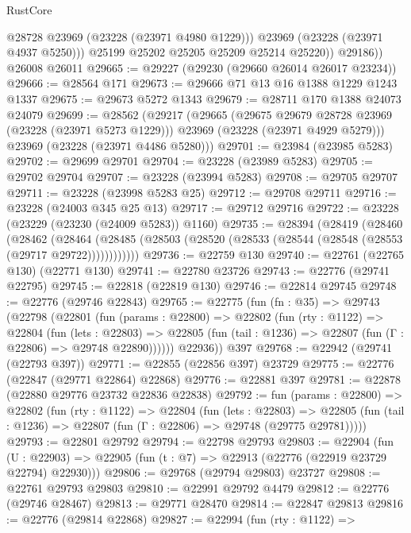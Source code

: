 \begin{lexlean}{RustCore}
\begin{coremodule}
                @28728
                @23969
                (@23228 (@23971 @4980 @1229)))
              @23969
              (@23228 (@23971 @4937 @5250)))
            @25199
            @25202
            @25205
            @25209
            @25214
            @25220))
        @29186))
    @26008
    @26011
@29665 := @29227 (@29230 (@29660 @26014 @26017 @23234))
@29666 := @28564 @171
@29673 := @29666 @71 @13 @16 @1388 @1229 @1243 @1337
@29675 := @29673 @5272 @1343
@29679 := @28711 @170 @1388 @24073 @24079
@29699 := @28562
    (@29217
      (@29665
        (@29675 @29679 @28728 @23969 (@23228 (@23971 @5273 @1229)))
        @23969
        (@23228 (@23971 @4929 @5279)))
      @23969
      (@23228 (@23971 @4486 @5280)))
@29701 := @23984 (@23985 @5283)
@29702 := @29699 @29701
@29704 := @23228 (@23989 @5283)
@29705 := @29702 @29704
@29707 := @23228 (@23994 @5283)
@29708 := @29705 @29707
@29711 := @23228 (@23998 @5283 @25)
@29712 := @29708 @29711
@29716 := @23228 (@24003 @345 @25 @13)
@29717 := @29712 @29716
@29722 := @23228 (@23229 (@23230 (@24009 @5283)) @1160)
@29735 := @28394
    (@28419
      (@28460
        (@28462
          (@28464 (@28485 (@28503 (@28520 (@28533 (@28544 (@28548 (@28553 (@29717 @29722))))))))))))
@29736 := @22759 @130
@29740 := @22761 (@22765 @130) (@22771 @130)
@29741 := @22780 @23726
@29743 := @22776 (@29741 @22795)
@29745 := @22818 (@22819 @130)
@29746 := @22814 @29745
@29748 := @22776 (@29746 @22843)
@29765 := @22775
    (fun (fn : @35) =>
    @29743
      (@22798
        (@22801
          (fun (params : @22800) =>
          @22802
            (fun (rty : @1122) =>
            @22804
              (fun (lets : @22803) =>
              @22805 (fun (tail : @1236) => @22807 (fun (Γ : @22806) => @29748 @22890))))))
        @22936))
    @397
@29768 := @22942 (@29741 (@22793 @397))
@29771 := @22855 (@22856 @397) @23729
@29775 := @22776 (@22847 (@29771 @22864) @22868)
@29776 := @22881 @397
@29781 := @22878 (@22880 @29776 @23732 @22836 @22838)
@29792 := fun (params : @22800) =>
  @22802
    (fun (rty : @1122) =>
    @22804
      (fun (lets : @22803) =>
      @22805 (fun (tail : @1236) => @22807 (fun (Γ : @22806) => @29748 (@29775 @29781)))))
@29793 := @22801 @29792
@29794 := @22798 @29793
@29803 := @22904
    (fun (U : @22903) => @22905 (fun (t : @7) => @22913 (@22776 (@22919 @23729 @22794) @22930)))
@29806 := @29768 (@29794 @29803) @23727
@29808 := @22761 @29793 @29803
@29810 := @22991 @29792 @4479
@29812 := @22776 (@29746 @28467)
@29813 := @29771 @28470
@29814 := @22847 @29813
@29816 := @22776 (@29814 @22868)
@29827 := @22994
    (fun (rty : @1122) =>

\end{coremodule}
\end{lexlean}
